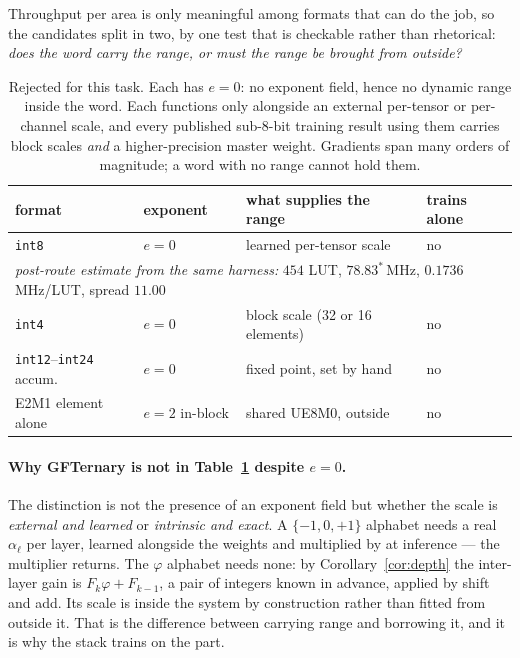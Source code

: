 \label{sec:untrainable}

Throughput per area is only meaningful among formats that can do the job, so the
candidates split in two, by one test that is checkable rather than rhetorical:
\emph{does the word carry the range, or must the range be brought from outside?}

\begin{table}[t]\centering
\caption{Rejected for this task. Each has $e=0$: no exponent field, hence no
dynamic range inside the word. Each functions only alongside an external
per-tensor or per-channel scale, and every published sub-8-bit training result
using them carries block scales \emph{and} a higher-precision master weight.
Gradients span many orders of magnitude; a word with no range cannot hold them.}
\label{tab:rejected}
\small\setlength{\tabcolsep}{4pt}
\begin{tabular}{llll}
\toprule
format & exponent & what supplies the range & trains alone \\
\midrule
\texttt{int8} & $e=0$ & learned per-tensor scale & no \\
\multicolumn{4}{l}{\quad\emph{post-route estimate from the same harness:} $454$ LUT, $78.83^{\ast}$\,MHz, $0.1736$ MHz/LUT, spread $11.00$} \\
\texttt{int4} & $e=0$ & block scale (32 or 16 elements) & no \\
\texttt{int12}--\texttt{int24} accum. & $e=0$ & fixed point, set by hand & no \\
E2M1 element alone & $e=2$ in-block & shared UE8M0, outside & no \\
\bottomrule
\end{tabular}
\end{table}

\paragraph{Why GFTernary is not in Table~\ref{tab:rejected} despite $e=0$.}
The distinction is not the presence of an exponent field but whether the scale is
\emph{external and learned} or \emph{intrinsic and exact}. A $\{-1,0,+1\}$
alphabet needs a real $\alpha_\ell$ per layer, learned alongside the weights and
multiplied by at inference --- the multiplier returns. The $\varphi$ alphabet
needs none: by Corollary~\ref{cor:depth} the inter-layer gain is
$F_k\varphi + F_{k-1}$, a pair of integers known in advance, applied by shift and
add. Its scale is inside the system by construction rather than fitted from
outside it. That is the difference between carrying range and borrowing it, and
it is why the stack trains on the part.

